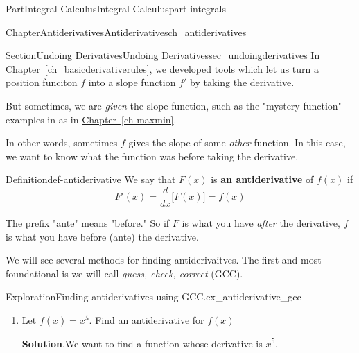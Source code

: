 \documentclass{tufte-book}
\newcommand{\blocktitlefont}{\relax}
\newcommand{\xreffont}{\relax}
\newcommand{\terminology}[1]{\textbf{#1}}
\numberwithin{equation}{chapter}
\newcommand{\ddx}[1]{ \dfrac{d}{dx} \Big[ #1 \Big]  }
\begin{document}
\begin{partptx}{Part}{Integral Calculus}{}{Integral Calculus}{}{}{part-integrals}
\renewcommand*{\partname}{Part}
%
\typeout{************************************************}
\typeout{************************************************}
%
\begin{chapterptx}{Chapter}{Antiderivatives}{}{Antiderivatives}{}{}{ch_antiderivatives}
\renewcommand*{\chaptername}{Chapter}
%
%
\typeout{************************************************}
\typeout{************************************************}
%
\begin{sectionptx}{Section}{Undoing Derivatives}{}{Undoing Derivatives}{}{}{sec_undoingderivatives}
In \hyperref[ch_basicderivativerules]{Chapter~{\xreffont\ref{ch_basicderivativerules}}\textendash{}{\xreffont\ref{ch_chainrule}}}, we developed tools which let us turn a position funciton \(f\) into a slope function \(f'\) by taking the derivative.%
\par
But sometimes, we are  \emph{given} the slope function, such as the "mystery function" examples in as in \hyperref[ch-maxmin]{Chapter~{\xreffont\ref{ch-maxmin}}}.%
\par
In other words, sometimes \(f\) gives the slope of some \emph{other} function. In this case, we want to know what the function was before taking the derivative.%
\begin{definition}{Definition}{}{def-antiderivative}%
We say that \(F(x)\) is \terminology{an antiderivative} of \(f(x)\) if%
\begin{equation*}
F'(x) = \ddx{F(x)} = f(x)
\end{equation*}
%
\par
The prefix "ante" means "before." So if \(F\) is what you have \emph{after} the derivative, \(f\) is what you have before (ante) the derivative.%
\end{definition}
We will see several methods for finding antiderivaitves. The first and most foundational is we will call \emph{guess, check, correct} (GCC).%
\begin{exploration}{Exploration}{Finding antiderivatives using GCC.}{ex_antiderivative_gcc}%
\begin{enumerate}[font=\bfseries,label=(\alph*),ref=\alph*]%
\item{}Let \(f(x)=x^5\). Find an antiderivative for \(f(x)\)%
\par\smallskip%
\noindent\textbf{\blocktitlefont Solution}.\hypertarget{ex_antiderivative_gcc-2-2}{}\quad{}We want to find a function whose derivative is \(x^5\).%

\end{enumerate}
\end{exploration}
\end{sectionptx}
\end{chapterptx}
\end{partptx}
\end{document}
